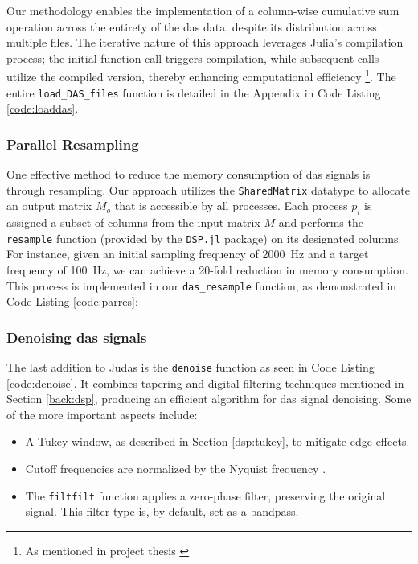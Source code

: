 Our methodology enables the implementation of a column-wise cumulative sum operation across the entirety of the \acrshort{das} data, despite its distribution across multiple files. The iterative nature of this approach leverages Julia's compilation process; the initial function call triggers compilation, while subsequent calls utilize the compiled version, thereby enhancing computational efficiency \footnote{As mentioned in project thesis  \cite{projthesis}}. The entire \lstinline{load_DAS_files} function is detailed in the Appendix in Code Listing \ref{code:loaddas}.

\subsubsection{Parallel Resampling}

One effective method to reduce the memory consumption of \acrshort{das} signals is through resampling. Our approach utilizes the \texttt{SharedMatrix} datatype to allocate an output matrix $M_o$ that is accessible by all processes. Each process $p_i$ is assigned a subset of columns from the input matrix $M$ and performs the \texttt{resample} function (provided by the \texttt{DSP.jl} package) on its designated columns. For instance, given an initial sampling frequency of \qty{2000}{\hertz} and a target frequency of \qty{100}{\hertz}, we can achieve a 20-fold reduction in memory consumption. This process is implemented in our \texttt{das\_resample} function, as demonstrated in Code Listing \ref{code:parres}:



\clearpage
\subsubsection{Denoising \acrshort{das} signals}



The last addition to Judas is the \texttt{denoise} function as seen in Code Listing \ref{code:denoise}. It combines tapering and digital filtering techniques mentioned in Section \ref{back:dsp}, producing an efficient algorithm for \acrshort{das} signal denoising. Some of the more important aspects include: 

\begin{itemize}
    \item A Tukey window, as described in Section \ref{dsp:tukey}, to mitigate edge effects.
    \item Cutoff frequencies are normalized by the Nyquist frequency \cite{schmogrow2012nyquist}.
    \item The \texttt{filtfilt} function applies a zero-phase filter, preserving the original signal. This filter type is, by default, set as a bandpass. 
\end{itemize}

